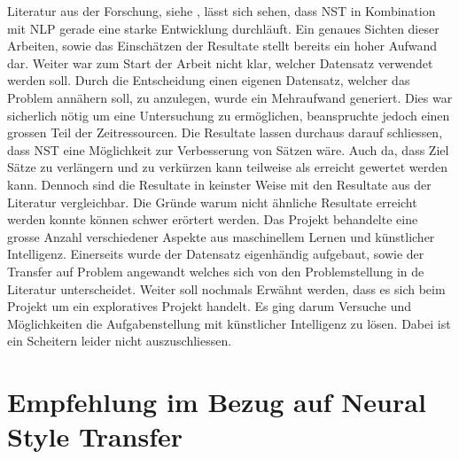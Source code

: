 Literatur aus der Forschung, siehe \cite{fuzhenxin_2019}, lässt sich sehen, dass \gls{NST} in Kombination mit \gls{NLP}
gerade eine starke Entwicklung durchläuft. Ein genaues Sichten dieser Arbeiten, sowie das Einschätzen der Resultate
stellt bereits ein hoher Aufwand dar. 
\newline
\newline
Weiter war zum Start der Arbeit nicht klar, welcher Datensatz verwendet werden soll. Durch die Entscheidung einen
eigenen Datensatz, welcher das Problem annähern soll, zu anzulegen, wurde ein Mehraufwand generiert. Dies war sicherlich
nötig um eine Untersuchung zu ermöglichen, beanspruchte jedoch einen grossen Teil der Zeitressourcen.
\newline
\newline
Die Resultate lassen durchaus darauf schliessen, dass \gls{NST} eine Möglichkeit zur Verbesserung von Sätzen wäre. Auch
da, dass Ziel Sätze zu verlängern und zu verkürzen kann teilweise als erreicht gewertet werden kann. Dennoch sind die
Resultate in keinster Weise mit den Resultate aus der Literatur vergleichbar. Die Gründe warum nicht ähnliche Resultate
erreicht werden konnte können schwer erörtert werden. Das Projekt behandelte eine grosse Anzahl verschiedener Aspekte
aus maschinellem Lernen und künstlicher Intelligenz. Einerseits wurde der Datensatz eigenhändig aufgebaut, sowie der
Transfer auf Problem angewandt welches sich von den Problemstellung in de Literatur unterscheidet. 
\newline
\newline
Weiter soll nochmals Erwähnt werden, dass es sich beim Projekt um ein exploratives Projekt handelt. Es ging darum
Versuche und Möglichkeiten die Aufgabenstellung mit künstlicher Intelligenz zu lösen. Dabei ist ein Scheitern leider
nicht auszuschliessen.

\section{Empfehlung im Bezug auf Neural Style Transfer}
\label{sec:empfehlung_nst}

